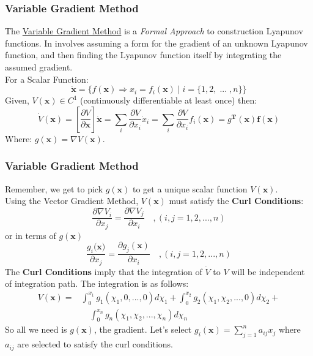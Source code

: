 \documentclass[11pt,handout]{beamer}   %
\begin{document}
\begin{frame}
\frametitle{Variable Gradient Method}
\small
The \underline{Variable Gradient Method} is a \textit{Formal Approach} to construction Lyapunov functions. In involves assuming a form for the gradient of an unknown Lyapunov function, and then finding the Lyapunov function itself by integrating the assumed gradient.\\
\vspace{6pt}
For a Scalar Function:
\begin{equation*}
\dot{\mathbf{x}} = \lbrace \left. f(\mathbf{x}) \Rightarrow x_i = f_i(\mathbf{x}) \;  | \; i = \lbrace 1,2,\; ... \;, n \rbrace \right. \rbrace
\end{equation*}
Given, $V(\mathbf{x}) \in C^1$ (continuously differentiable at least once) then:
\begin{equation*}
\dot{V}(\mathbf{x}) = \left[ \frac{\partial V}{\partial \mathbf{x}}\right] \dot{\mathbf{x}} = \sum_i  \frac{\partial V}{\partial x_i} \dot{x}_i = \sum_i \frac{\partial V}{\partial x_i} f_i(\mathbf{x}) = g\mathbf{^T}(\mathbf{x})\mathbf{f(x)}
\end{equation*}
Where: $g(\mathbf{x}) = \nabla V(\mathbf{x})$.
\end{frame}

\begin{frame}
\frametitle{Variable Gradient Method}
\small
Remember, we get to pick $g(\mathbf{x})$ to get a unique scalar function $V(\mathbf{x})$.\\
\vspace{6pt}
Using the Vector Gradient Method, $V(\mathbf{x})$ must satisfy the \textbf{Curl Conditions}:
\begin{equation*}
\frac{\partial \nabla V_i}{\partial x_j} = \frac{\partial \nabla V_j}{\partial x_i} \quad , (i,j = 1,2,...,n)
\end{equation*}
or in terms of $g(\mathbf{x})$
\begin{equation*}
\frac{g_i(\mathbf{x)}}{\partial x_j} = \frac{\partial g_j (\mathbf{x})}{\partial x_i} \quad , (i,j = 1,2,...,n)
\end{equation*}
The \textbf{Curl Conditions} imply that the integration of $\dot{V}$ to $V$ will be independent of integration path. The integration is as follows:
\begin{equation*}
\begin{split}
V(\mathbf{x}) =& \int_0^{x_1} g_1(\chi_1,0,...,0) d\chi_1 +  \int_0^{x_2} g_2(\chi_1,\chi_2,...,0) d\chi_2 + \\  & \quad \int_0^{x_n} g_n(\chi_1,\chi_2,...,\chi_n) d\chi_n
\end{split}
\end{equation*}
So all we need is  $g(\mathbf{x})$, the gradient. Let's select $g_i(\mathbf{x}) = \sum_{j = 1}^{n} a_{ij} x_j$ where $a_{ij}$ are selected to satisfy the curl conditions.
\end{frame}
\end{document}
